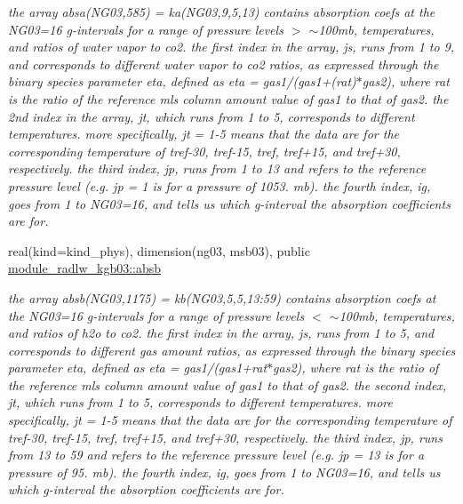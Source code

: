 \begin{DoxyCompactItemize}
\begin{DoxyCompactList}\small\item\em the array absa(\+N\+G03,585) = ka(\+N\+G03,9,5,13) contains absorption coefs at the N\+G03=16 g-\/intervals for a range of pressure levels $>$ $\sim$100mb, temperatures, and ratios of water vapor to co2. the first index in the array, js, runs from 1 to 9, and corresponds to different water vapor to co2 ratios, as expressed through the binary species parameter eta, defined as eta = gas1/(gas1+(rat)$\ast$gas2), where rat is the ratio of the reference mls column amount value of gas1 to that of gas2. the 2nd index in the array, jt, which runs from 1 to 5, corresponds to different temperatures. more specifically, jt = 1-\/5 means that the data are for the corresponding temperature of tref-\/30, tref-\/15, tref, tref+15, and tref+30, respectively. the third index, jp, runs from 1 to 13 and refers to the reference pressure level (e.\+g. jp = 1 is for a pressure of 1053. mb). the fourth index, ig, goes from 1 to N\+G03=16, and tells us which g-\/interval the absorption coefficients are for. \end{DoxyCompactList}\item 
real(kind=kind\+\_\+phys), dimension(ng03, msb03), public \hyperlink{group__module__radlw__kgbnn_gaa84ba66e0a3cc018b03bd13c9c21e133}{module\+\_\+radlw\+\_\+kgb03\+::absb}
\begin{DoxyCompactList}\small\item\em the array absb(\+N\+G03,1175) = kb(\+N\+G03,5,5,13\+:59) contains absorption coefs at the N\+G03=16 g-\/intervals for a range of pressure levels $<$ $\sim$100mb, temperatures, and ratios of h2o to co2. the first index in the array, js, runs from 1 to 5, and corresponds to different gas amount ratios, as expressed through the binary species parameter eta, defined as eta = gas1/(gas1+rat$\ast$gas2), where rat is the ratio of the reference mls column amount value of gas1 to that of gas2. the second index, jt, which runs from 1 to 5, corresponds to different temperatures. more specifically, jt = 1-\/5 means that the data are for the corresponding temperature of tref-\/30, tref-\/15, tref, tref+15, and tref+30, respectively. the third index, jp, runs from 13 to 59 and refers to the reference pressure level (e.\+g. jp = 13 is for a pressure of 95. mb). the fourth index, ig, goes from 1 to N\+G03=16, and tells us which g-\/interval the absorption coefficients are for. \end{DoxyCompactList}\item 

\end{DoxyCompactItemize}
